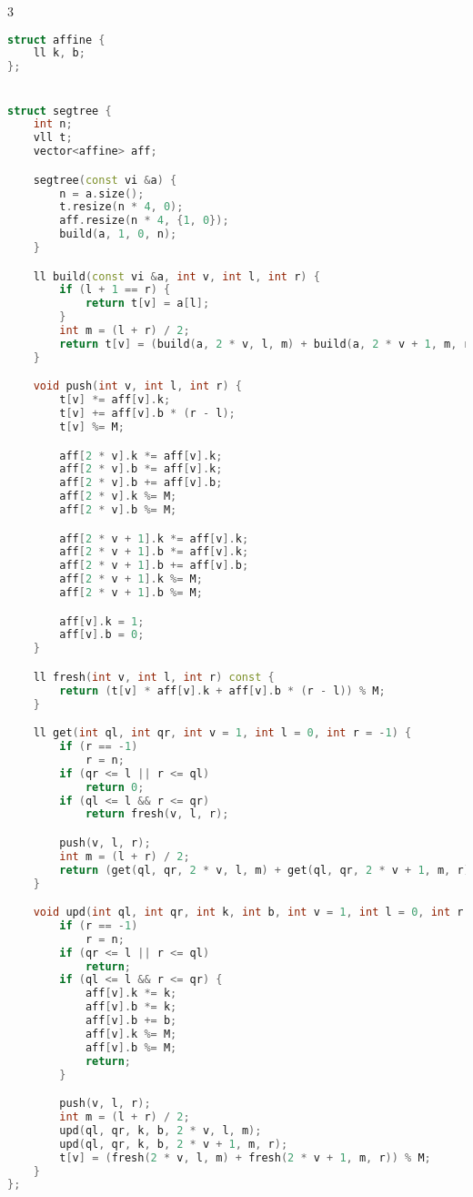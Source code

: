 \documentclass[10pt,a4paper,landscape,twosided]{extarticle}
\begin{document}
\begin{multicols}{3}
\begin{lstlisting}[language=C++]
struct affine {
    ll k, b;
};


struct segtree {
    int n;
    vll t;
    vector<affine> aff;

    segtree(const vi &a) {
        n = a.size();
        t.resize(n * 4, 0);
        aff.resize(n * 4, {1, 0});
        build(a, 1, 0, n);
    }

    ll build(const vi &a, int v, int l, int r) {
        if (l + 1 == r) {
            return t[v] = a[l];
        }
        int m = (l + r) / 2;
        return t[v] = (build(a, 2 * v, l, m) + build(a, 2 * v + 1, m, r)) % M;
    }

    void push(int v, int l, int r) {
        t[v] *= aff[v].k;
        t[v] += aff[v].b * (r - l);
        t[v] %= M;

        aff[2 * v].k *= aff[v].k;
        aff[2 * v].b *= aff[v].k;
        aff[2 * v].b += aff[v].b;
        aff[2 * v].k %= M;
        aff[2 * v].b %= M;

        aff[2 * v + 1].k *= aff[v].k;
        aff[2 * v + 1].b *= aff[v].k;
        aff[2 * v + 1].b += aff[v].b;
        aff[2 * v + 1].k %= M;
        aff[2 * v + 1].b %= M;

        aff[v].k = 1;
        aff[v].b = 0;
    }

    ll fresh(int v, int l, int r) const {
        return (t[v] * aff[v].k + aff[v].b * (r - l)) % M;
    }

    ll get(int ql, int qr, int v = 1, int l = 0, int r = -1) {
        if (r == -1)
            r = n;
        if (qr <= l || r <= ql)
            return 0;
        if (ql <= l && r <= qr)
            return fresh(v, l, r);

        push(v, l, r);
        int m = (l + r) / 2;
        return (get(ql, qr, 2 * v, l, m) + get(ql, qr, 2 * v + 1, m, r)) % M;
    }

    void upd(int ql, int qr, int k, int b, int v = 1, int l = 0, int r = -1) {
        if (r == -1)
            r = n;
        if (qr <= l || r <= ql)
            return;
        if (ql <= l && r <= qr) {
            aff[v].k *= k;
            aff[v].b *= k;
            aff[v].b += b;
            aff[v].k %= M;
            aff[v].b %= M;
            return;
        }

        push(v, l, r);
        int m = (l + r) / 2;
        upd(ql, qr, k, b, 2 * v, l, m);
        upd(ql, qr, k, b, 2 * v + 1, m, r);
        t[v] = (fresh(2 * v, l, m) + fresh(2 * v + 1, m, r)) % M;
    }
};
\end{lstlisting}


\end{multicols}
\end{document}
